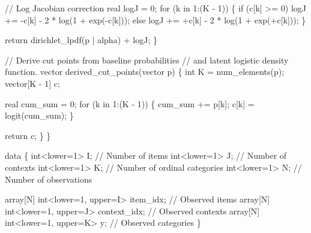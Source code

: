 \documentclass[
  letterpaper,
  DIV=11,
  numbers=noendperiod]{scrartcl}
\newenvironment{Shaded}{\begin{snugshade}}{\end{snugshade}}
\newcommand{\CommentTok}[1]{\textcolor[rgb]{0.37,0.37,0.37}{#1}}
\newcommand{\ControlFlowTok}[1]{\textcolor[rgb]{0.00,0.23,0.31}{#1}}
\newcommand{\DataTypeTok}[1]{\textcolor[rgb]{0.68,0.00,0.00}{#1}}
\newcommand{\DecValTok}[1]{\textcolor[rgb]{0.68,0.00,0.00}{#1}}
\newcommand{\KeywordTok}[1]{\textcolor[rgb]{0.00,0.23,0.31}{#1}}
\newcommand{\NormalTok}[1]{\textcolor[rgb]{0.00,0.23,0.31}{#1}}
\begin{document}
\begin{codelisting}
\begin{Shaded}
\begin{Highlighting}[]
    \CommentTok{// Log Jacobian correction}
    \DataTypeTok{real}\NormalTok{ logJ = }\DecValTok{0}\NormalTok{;}
    \ControlFlowTok{for}\NormalTok{ (k }\ControlFlowTok{in} \DecValTok{1}\NormalTok{:(K {-} }\DecValTok{1}\NormalTok{)) \{}
      \ControlFlowTok{if}\NormalTok{ (c[k] \textgreater{}= }\DecValTok{0}\NormalTok{)}
\NormalTok{        logJ += {-}c[k] {-} }\DecValTok{2}\NormalTok{ * log(}\DecValTok{1}\NormalTok{ + exp({-}c[k]));}
      \ControlFlowTok{else}
\NormalTok{        logJ += +c[k] {-} }\DecValTok{2}\NormalTok{ * log(}\DecValTok{1}\NormalTok{ + exp(+c[k]));}
\NormalTok{    \}}

    \ControlFlowTok{return}\NormalTok{ dirichlet\_lpdf(p | alpha) + logJ;}
\NormalTok{  \}}

  \CommentTok{// Derive cut points from baseline probabilities}
  \CommentTok{// and latent logistic density function.}
  \DataTypeTok{vector}\NormalTok{ derived\_cut\_points(}\DataTypeTok{vector}\NormalTok{ p) \{}
    \DataTypeTok{int}\NormalTok{ K = num\_elements(p);}
    \DataTypeTok{vector}\NormalTok{[K {-} }\DecValTok{1}\NormalTok{] c;}

    \DataTypeTok{real}\NormalTok{ cum\_sum = }\DecValTok{0}\NormalTok{;}
    \ControlFlowTok{for}\NormalTok{ (k }\ControlFlowTok{in} \DecValTok{1}\NormalTok{:(K {-} }\DecValTok{1}\NormalTok{)) \{}
\NormalTok{      cum\_sum += p[k];}
\NormalTok{      c[k] = logit(cum\_sum);}
\NormalTok{    \}}

    \ControlFlowTok{return}\NormalTok{ c;}
\NormalTok{  \}}
\NormalTok{\}}

\KeywordTok{data}\NormalTok{ \{}
  \DataTypeTok{int}\NormalTok{\textless{}}\KeywordTok{lower}\NormalTok{=}\DecValTok{1}\NormalTok{\textgreater{} I; }\CommentTok{// Number of items}
  \DataTypeTok{int}\NormalTok{\textless{}}\KeywordTok{lower}\NormalTok{=}\DecValTok{1}\NormalTok{\textgreater{} J; }\CommentTok{// Number of contexts}
  \DataTypeTok{int}\NormalTok{\textless{}}\KeywordTok{lower}\NormalTok{=}\DecValTok{1}\NormalTok{\textgreater{} K; }\CommentTok{// Number of ordinal categories}
  \DataTypeTok{int}\NormalTok{\textless{}}\KeywordTok{lower}\NormalTok{=}\DecValTok{1}\NormalTok{\textgreater{} N; }\CommentTok{// Number of observations}

  \DataTypeTok{array}\NormalTok{[N] }\DataTypeTok{int}\NormalTok{\textless{}}\KeywordTok{lower}\NormalTok{=}\DecValTok{1}\NormalTok{, }\KeywordTok{upper}\NormalTok{=I\textgreater{} item\_idx;    }\CommentTok{// Observed items}
  \DataTypeTok{array}\NormalTok{[N] }\DataTypeTok{int}\NormalTok{\textless{}}\KeywordTok{lower}\NormalTok{=}\DecValTok{1}\NormalTok{, }\KeywordTok{upper}\NormalTok{=J\textgreater{} context\_idx; }\CommentTok{// Observed contexts}
  \DataTypeTok{array}\NormalTok{[N] }\DataTypeTok{int}\NormalTok{\textless{}}\KeywordTok{lower}\NormalTok{=}\DecValTok{1}\NormalTok{, }\KeywordTok{upper}\NormalTok{=K\textgreater{} y;           }\CommentTok{// Observed categories}
\NormalTok{\}}


\end{Highlighting}
\end{Shaded}
\end{codelisting}
\end{document}
